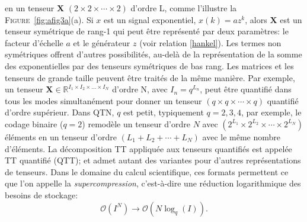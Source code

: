 \documentclass[11pt,a4paper,oneside]{book}
\def\op{\mathcal O}
\def\x{\mathbf x}
\def\RItn{\mathbb{R}^{I_1 \times I_2 \times \ldots \times I_N}}
\newcommand{\mbf}[1]{\mathbf{#1}}
\newcommand{\figref}[1]{\textsc{Figure}~\ref{#1}}
\begin{document}
en un tenseur $ \mbf{X} $ $ (2\times 2\times\cdots \times 2) $  d'ordre L, comme l'illustre la \figref{fig:afig3a}(a). Si $ x $ est un signal exponentiel, $ x(k) = az^{k} $, alors $ \mbf{X} $ est un tenseur symétrique de rang-1 qui peut être représenté par deux paramètres: le facteur d'échelle $ a $ et le générateur $ z $ (voir relation \eqref{hankel}). Les termes non symétriques offrent d'autres possibilités, au-delà de la représentation de la somme des exponentielles par des tenseurs symétriques de bas rang. Les matrices et les tenseurs de grande taille peuvent être traités de la même manière. Par exemple, un tenseur $ \mbf{X}\in\RItn $ d'ordre N, avec $ I_{n} = q^{L_{n}} $, peut être quantifié dans tous les modes simultanément pour donner un  tenseur $ (q\times q\times\cdots\times q) $ quantifié d'ordre supérieur. Dans QTN, $ q $ est petit, typiquement $ q = 2,3,4 $, par exemple, le codage binaire ($ q=2 $) remodèle un tenseur d'ordre $ N $ avec $ (2^{L_{1}}\times 2^{L_{2}}\times\cdots\times2^{L_{N}}) $ éléments en un tenseur d'ordre $ (L_{1} + L_{2} +\cdots+ L_{N}) $ avec le même nombre d'éléments. La décomposition TT appliquée aux tenseurs quantifiés est appelée TT quantifié (QTT); et admet autant des variantes pour d'autres représentations de tenseurs. Dans le domaine du calcul scientifique, ces formats permettent ce que l'on appelle la \textit{supercompression}, c'est-à-dire une réduction logarithmique des besoins de stockage: 
$$ \op(I^{N})\longrightarrow\op(N\log_{q}(I)) .$$
%
\end{document}
